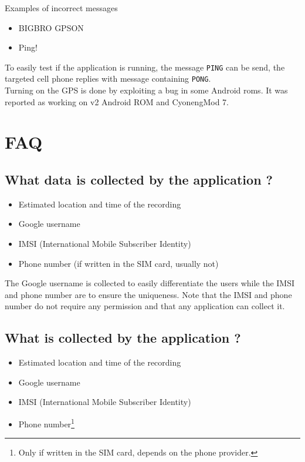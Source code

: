 \vspace{0.5cm}
Examples of incorrect messages
\begin{itemize}
\item BIGBRO GPSON
\item Ping!
\end{itemize}
\vspace{0.5cm}
To easily test if the application is running, the message \texttt{PING} can be send, the targeted cell phone replies with message containing \texttt{PONG}.\\

Turning on the GPS is done by exploiting a bug in some Android roms.
It was reported as working on v2 Android ROM and CyonengMod 7.

\section{FAQ}
\label{sec:faq}

\subsection{What data is collected by the application ?}

\begin{itemize}
\item Estimated location and time of the recording
\item Google username
\item IMSI (International Mobile Subscriber Identity)
\item Phone number (if written in the SIM card, usually not)
\end{itemize}

The Google username is collected to easily differentiate the users while the IMSI and phone number are to ensure the uniqueness.
Note that the IMSI and phone number do not require any permission and that any application can collect it.

\subsection{What is collected by the application ?}

\begin{itemize}
\item Estimated location and time of the recording
\item Google username
\item IMSI (International Mobile Subscriber Identity)
\item Phone number\footnote{Only if written in the SIM card, depends on the phone provider.}
\end{itemize}

